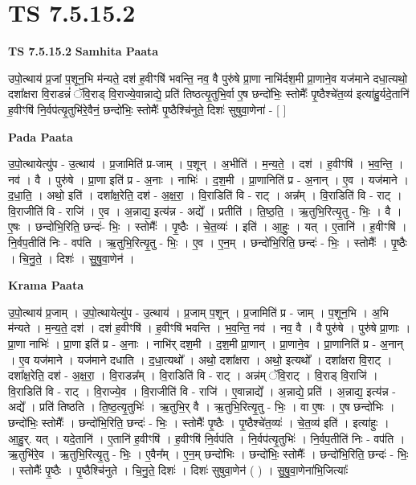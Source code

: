 \documentclass[17pt]{extarticle}
\begin{document}
\section{ TS 7.5.15.2 }

\textbf{TS 7.5.15.2 } \newline
\textbf{Samhita Paata} \newline

उपो॒त्थाय॑ प्र॒जां प॒शून॒भि म॑न्यते॒ दश॑ ह॒वीꣳषि॑ भवन्ति॒ नव॒ वै पुरु॑षे प्रा॒णा नाभि॑र्दश॒मी प्रा॒णाने॒व यज॑माने दधा॒त्यथो॒ दशा᳚क्षरा वि॒राडन्नं॑ ॅवि॒राड् वि॒राज्ये॒वान्नाद्ये॒ प्रति॑ तिष्ठत्यृ॒तुभि॒र्वा ए॒ष छन्दो॑भिः॒ स्तोमैः᳚ पृ॒ष्ठैश्चे॑त॒व्य॑ इत्या॑हु॒र्यदे॒तानि॑ ह॒वीꣳषि॑ नि॒र्वप॑त्यृ॒तुभि॑रे॒वैनं॒ छन्दो॑भिः॒ स्तोमैः᳚ पृ॒ष्ठैश्चि॑नुते॒ दिशः॑ सुषुवा॒णेना॑ - [  ] \newline

\textbf{Pada Paata} \newline

उ॒पो॒त्थायेत्यु॑प - उ॒त्थाय॑ । प्र॒जामिति॑ प्र-जाम् । प॒शून् । अ॒भीति॑ । म॒न्य॒ते॒ । दश॑ । ह॒वीꣳषि॑ । भ॒व॒न्ति॒ । नव॑ । वै । पुरु॑षे । प्रा॒णा इति॑ प्र - अ॒नाः । नाभिः॑ । द॒श॒मी । प्रा॒णानिति॑ प्र - अ॒नान् । ए॒व । यज॑माने । द॒धा॒ति॒ । अथो॒ इति॑ । दशा᳚क्ष॒रेति॒ दश॑ - अ॒क्ष॒रा॒ । वि॒राडिति॑ वि - राट् । अन्न᳚म् । वि॒राडिति॑ वि - राट् । वि॒राजीति॑ वि - राजि॑ । ए॒व । अ॒न्नाद्य॒ इत्य॑न्न - अद्ये᳚ । प्रतीति॑ । ति॒ष्ठ॒ति॒ । ऋ॒तुभि॒रित्यृ॒तु - भिः॒ । वै । ए॒षः । छन्दो॑भि॒रिति॒ छन्दः॑- भिः॒ । स्तोमैः᳚ । पृ॒ष्ठैः । चे॒त॒व्यः॑ । इति॑ । आ॒हुः॒ । यत् । ए॒तानि॑ । ह॒वीꣳषि॑ । नि॒र्वप॒तीति॑ निः - वप॑ति । ऋ॒तुभि॒रित्यृ॒तु - भिः॒ । ए॒व । ए॒न॒म् । छन्दो॑भि॒रिति॒ छन्दः॑ - भिः॒ । स्तोमैः᳚ । पृ॒ष्ठैः । चि॒नु॒ते॒ । दिशः॑ । सु॒षु॒वा॒णेन॑ ।  \newline


\textbf{Krama Paata} \newline

उ॒पो॒त्थाय॑ प्र॒जाम् । उ॒पो॒त्थायेत्यु॑प - उ॒त्थाय॑ । प्र॒जाम् प॒शून् । प्र॒जामिति॑ प्र - जाम् । प॒शून॒भि । अ॒भि म॑न्यते । म॒न्य॒ते॒ दश॑ । दश॑ ह॒वीꣳषि॑ । ह॒वीꣳषि॑ भवन्ति । भ॒व॒न्ति॒ नव॑ । नव॒ वै । वै पुरु॑षे । पुरु॑षे प्रा॒णाः । प्रा॒णा नाभिः॑ । प्रा॒णा इति॑ प्र - अ॒नाः । नाभि॑र् दश॒मी । द॒श॒मी प्रा॒णान् । प्रा॒णाने॒व । प्रा॒णानिति॑ प्र - अ॒नान् । ए॒व यज॑माने । यज॑माने दधाति । द॒धा॒त्यथो᳚ । अथो॒ दशा᳚क्षरा । अथो॒ इत्यथो᳚ । दशा᳚क्षरा वि॒राट् । दशा᳚क्ष॒रेति॒ दश॑ - अ॒क्ष॒रा॒ । वि॒राडन्न᳚म् । वि॒राडिति॑ वि - राट् । अन्न॑म् ॅवि॒राट् । वि॒राड् वि॒राजि॑ । वि॒राडिति॑ वि - राट् । वि॒राज्ये॒व । वि॒राजीति॑ वि - राजि॑ । ए॒वान्नाद्ये᳚ । अ॒न्नाद्ये॒ प्रति॑ । अ॒न्नाद्य॒ इत्य॑न्न - अद्ये᳚ । प्रति॑ तिष्ठति । ति॒ष्ठ॒त्यृ॒तुभिः॑ । ऋ॒तुभि॒र् वै । ऋ॒तुभि॒रित्यृ॒तु - भिः॒ । वा ए॒षः । ए॒ष छन्दो॑भिः । छन्दो॑भिः॒ स्तोमैः᳚ । छन्दो॑भि॒रिति॒ छन्दः॑ - भिः॒ । स्तोमैः᳚ पृ॒ष्ठैः । पृ॒ष्ठैश्चे॑त॒व्यः॑ । चे॒त॒व्य॑ इति॑ । इत्या॑हुः । आ॒हु॒र्. यत् । यदे॒तानि॑ । ए॒तानि॑ ह॒वीꣳषि॑ । ह॒वीꣳषि॑ नि॒र्वप॑ति । नि॒र्वप॑त्यृ॒तुभिः॑ । नि॒र्वप॒तीति॑ निः - वप॑ति । ऋ॒तुभि॑रे॒व । ऋ॒तुभि॒रित्यृ॒तु - भिः॒ । ए॒वैन᳚म् । ए॒न॒म् छन्दो॑भिः । छन्दो॑भिः॒ स्तोमैः᳚ । छन्दो॑भि॒रिति॒ छन्दः॑ - भिः॒ । स्तोमैः᳚ पृ॒ष्ठैः । पृ॒ष्ठैश्चि॑नुते । चि॒नु॒ते॒ दिशः॑ । दिशः॑ सुषुवा॒णेन॑ ( ) । सु॒षु॒वा॒णेना॑भि॒जित्याः᳚ \newline
\end{document}
